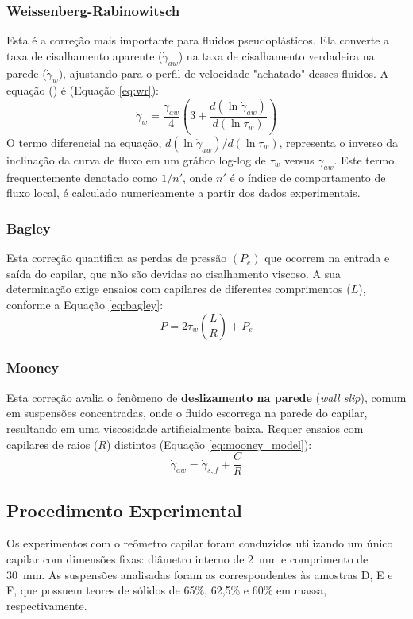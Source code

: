 \documentclass[article,12pt,oneside,a4paper,english,brazil,sumario=tradicional]{abntex2}
\begin{document}
\subsubsection{Weissenberg-Rabinowitsch}
Esta é a correção mais importante para fluidos pseudoplásticos. Ela converte a taxa de cisalhamento aparente ($\dot{\gamma}_{aw}$) na taxa de cisalhamento verdadeira na parede ($\dot{\gamma}_w$), ajustando para o perfil de velocidade "achatado" desses fluidos. A equação () é (Equação \ref{eq:wr}):
\begin{equation} \label{eq:wr}
    \dot{\gamma}_w = \frac{\dot{\gamma}_{aw}}{4} \left( 3 + \frac{d(\ln \dot{\gamma}_{aw})}{d(\ln \tau_w)} \right)
\end{equation}
O termo diferencial na equação, $d(\ln \dot{\gamma}_{aw})/d(\ln \tau_w)$, representa o inverso da inclinação da curva de fluxo em um gráfico log-log de $\tau_w$ versus $\dot{\gamma}_{aw}$. Este termo, frequentemente denotado como $1/n'$, onde $n'$ é o índice de comportamento de fluxo local, é calculado numericamente a partir dos dados experimentais.

\subsubsection{Bagley}
Esta correção quantifica as perdas de pressão $(P_e)$ que ocorrem na entrada e saída do capilar, que não são devidas ao cisalhamento viscoso. A sua determinação exige ensaios com capilares de diferentes comprimentos ($L$), conforme a Equação \ref{eq:bagley}:
\begin{equation} \label{eq:bagley}
    P = 2 \tau_w \left( \frac{L}{R} \right) + P_e
\end{equation}

\subsubsection{Mooney}
Esta correção avalia o fenômeno de \textbf{deslizamento na parede} (\textit{wall slip}), comum em suspensões concentradas, onde o fluido escorrega na parede do capilar, resultando em uma viscosidade artificialmente baixa. Requer ensaios com capilares de raios ($R$) distintos (Equação \ref{eq:mooney_model}):
\begin{equation} \label{eq:mooney_model}
    \dot{\gamma}_{aw} = \dot{\gamma}_{s,f} + \frac{C}{R}
\end{equation}

\subsection{Procedimento Experimental}
Os experimentos com o reômetro capilar foram conduzidos utilizando um único capilar com dimensões fixas: diâmetro interno de \SI{2}{\milli\meter} e comprimento de \SI{30}{\milli\meter}. As suspensões analisadas foram as correspondentes às amostras D, E e F, que possuem teores de sólidos de 65\%, 62,5\% e 60\% em massa, respectivamente.
\end{document}
